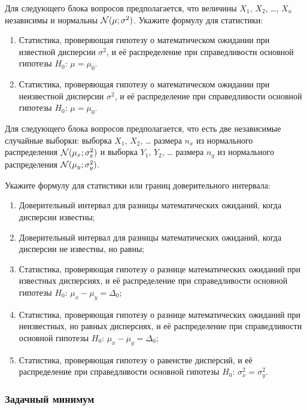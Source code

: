 Для следующего блока вопросов предполагается, что величины $X_1$, $X_2$, \ldots, $X_n$ независимы и нормальны $\mathcal{N}(\mu;\sigma^2)$.
Укажите формулу для статистики:

\begin{enumerate}[resume]
  \item Статистика, проверяющая гипотезу о математическом ожидании при известной дисперсии $\sigma^2$,
    и её распределение при справедливости основной гипотезы  $H_0$: $\mu = \mu_0$.
  \item Статистика, проверяющая гипотезу о математическом ожидании при неизвестной дисперсии $\sigma^2$,
    и её распределение при справедливости основной гипотезы  $H_0$: $\mu = \mu_0$.
\end{enumerate}


Для следующего блока вопросов предполагается, что есть две независимые случайные выборки:
выборка $X_1$, $X_2$, \ldots{ }размера $n_x$ из нормального распределения $\mathcal{N}(\mu_x;\sigma^2_x)$
и выборка $Y_1$, $Y_2$, \ldots{ }размера $n_y$ из нормального распределения $\mathcal{N}(\mu_y;\sigma^2_y)$.

Укажите формулу для статистики или границ доверительного интервала:

\begin{enumerate}[resume]
  \item Доверительный интервал для разницы математических ожиданий, когда дисперсии известны;
  \item Доверительный интервал для разницы математических ожиданий, когда дисперсии не известны, но равны;
  \item Статистика, проверяющая гипотезу о разнице математических ожиданий при известных дисперсиях,
    и её распределение при справедливости основной гипотезы $H_0$: $\mu_x - \mu_y = \Delta_0$;
  \item Статистика, проверяющая гипотезу о разнице математических ожиданий при неизвестных, но равных дисперсиях,
    и её распределение при справедливости основной гипотезы $H_0$: $\mu_x - \mu_y = \Delta_0$;
  \item Статистика, проверяющая гипотезу о равенстве дисперсий,
    и её распределение при справедливости основной гипотезы $H_0$: $\sigma^2_x = \sigma^2_y$.
\end{enumerate}


\subsubsection*{Задачный минимум}



